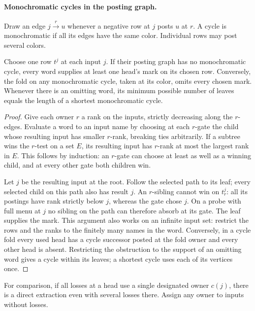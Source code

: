 \paragraph{Monochromatic cycles in the posting graph.}
Draw an edge $j\xrightarrow{r}u$ whenever a negative row at $j$ posts
$u$ at $r$. A cycle is monochromatic if all its edges have the same
color. Individual rows may post several colors.

\begin{lemma}
\label{core:lem:ranked-posting-survivor}
Choose one row $t^j$ at each input $j$. If their posting graph has no
monochromatic cycle, every word supplies at least one head's mark on
its chosen row. Conversely, the fold on any monochromatic cycle, taken
at its color, omits every chosen mark. Whenever there is an omitting
word, its minimum possible number of leaves equals the length of a
shortest monochromatic cycle.
\end{lemma}
\begin{proof}
Give each owner $r$ a rank on the inputs, strictly decreasing along
the $r$-edges. Evaluate a word to an input name by choosing at each
$r$-gate the child whose resulting input has smaller $r$-rank,
breaking ties arbitrarily. If a subtree wins the $r$-test on a set
$E$, its resulting input has $r$-rank at most the largest rank in
$E$. This follows by induction: an $r$-gate can choose at least as
well as a winning child, and at every other gate both children win.

Let $j$ be the resulting input at the root. Follow the selected path
to its leaf; every selected child on this path also has result $j$.
An $r$-sibling cannot win on $t^j_r$: all its postings have rank
strictly below $j$, whereas the gate chose $j$. On a probe with full
menu at $j$ no sibling on the path can therefore absorb at its gate.
The leaf supplies the mark. This argument also works on an infinite
input set: restrict the rows and the ranks to the finitely many
names in the word. Conversely, in a cycle fold every used
head has a cycle successor posted at the fold owner and every other
head is absent. Restricting the obstruction to the support of an
omitting word gives a cycle within its leaves; a shortest cycle uses
each of its vertices once.
\end{proof}

For comparison, if all losses at a head use a single designated owner
$c(j)$, there is a direct extraction even with several losses there.
Assign any owner to inputs without losses.

